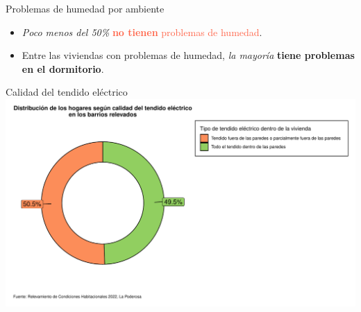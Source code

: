 \documentclass[aspectratio=169]{beamer}
\begin{document}
\begin{frame}{Problemas de humedad por ambiente}
\begin{minipage}{.65\linewidth}
\begin{overlayarea}{\linewidth}{.75\textheight}
            \end{overlayarea}
        \end{minipage}
        \begin{minipage}{.34\linewidth}
            \setlength{\leftmargini}{12pt}
            \begin{itemize}
                \item<2-> \textit{Poco menos del 50\%} \textcolor{tomato}{\textbf{no tienen} problemas de humedad}. 

                \item<4-> Entre las viviendas con problemas de humedad, \textit{la mayoría} \textbf{tiene \textcolor{gold!90!black}{problemas en el dormitorio}}.
            \end{itemize}
        \end{minipage}
    \end{frame}

    \begin{frame}{Calidad del tendido eléctrico}
        \includegraphics[height=.75\textheight]{graficas-pdf/sectores-circ-calidad-tendido-electrico.pdf}
    \end{frame}
    
\end{document}

